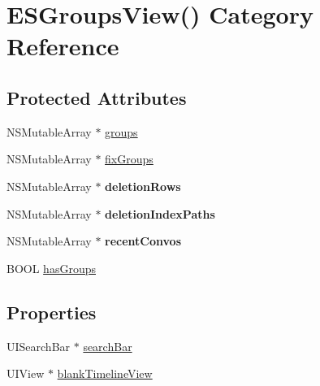 \hypertarget{category_e_s_groups_view_07_08}{}\section{E\+S\+Groups\+View() Category Reference}
\label{category_e_s_groups_view_07_08}
\subsection*{Protected Attributes}
\begin{DoxyCompactItemize}
\item 
N\+S\+Mutable\+Array $\ast$ \hyperlink{category_e_s_groups_view_07_08_a596689a0105424b4b7d7e7e3bc257511}{groups}
\item 
N\+S\+Mutable\+Array $\ast$ \hyperlink{category_e_s_groups_view_07_08_acfd5ac0d02856eff3eea8bebbd9090d7}{fix\+Groups}
\item 
\hypertarget{category_e_s_groups_view_07_08_af6d14bc97f7039325b7372a9eab6c05e}{}N\+S\+Mutable\+Array $\ast$ {\bfseries deletion\+Rows}\label{category_e_s_groups_view_07_08_af6d14bc97f7039325b7372a9eab6c05e}

\item 
\hypertarget{category_e_s_groups_view_07_08_a0440980f23af10a843455941793a00ee}{}N\+S\+Mutable\+Array $\ast$ {\bfseries deletion\+Index\+Paths}\label{category_e_s_groups_view_07_08_a0440980f23af10a843455941793a00ee}

\item 
\hypertarget{category_e_s_groups_view_07_08_a470af82d189bf912406ca085a16d5369}{}N\+S\+Mutable\+Array $\ast$ {\bfseries recent\+Convos}\label{category_e_s_groups_view_07_08_a470af82d189bf912406ca085a16d5369}

\item 
B\+O\+O\+L \hyperlink{category_e_s_groups_view_07_08_ae6de7a52fa81eb67912469107b513e0c}{has\+Groups}
\end{DoxyCompactItemize}
\subsection*{Properties}
\begin{DoxyCompactItemize}
\item 
U\+I\+Search\+Bar $\ast$ \hyperlink{category_e_s_groups_view_07_08_a1c61813a81e48caf8ec5aafb97f2bdab}{search\+Bar}
\item 
U\+I\+View $\ast$ \hyperlink{category_e_s_groups_view_07_08_ac87ef0c6673162f8995415427fa4e3dc}{blank\+Timeline\+View}
\end{DoxyCompactItemize}


